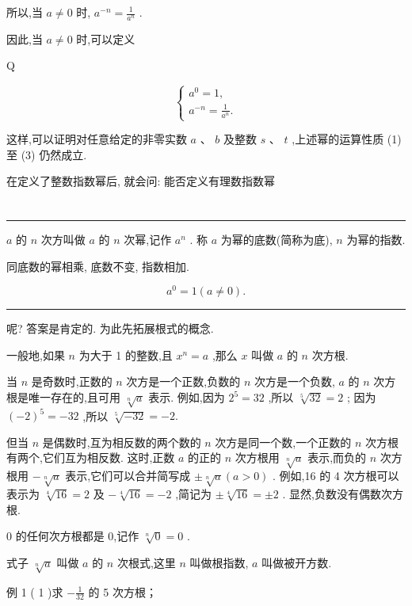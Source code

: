 \documentclass[10pt]{article}
\newcommand{\HRule}{\begin{center}\rule{0.9\linewidth}{0.2mm}\end{center}}
\begin{document}
所以,当 \(a \neq  0\) 时, \({a}^{-n} = \frac{1}{{a}^{n}}\) .

因此,当 \(a \neq  0\) 时,可以定义

Q

\[
\left\{  \begin{array}{l} {a}^{0} = 1, \\  {a}^{-n} = \frac{1}{{a}^{n}}. \end{array}\right.
\]

这样,可以证明对任意给定的非零实数 \(a\text{ 、 }b\) 及整数 \(s\text{ 、 }t\) ,上述幂的运算性质 (1) 至 (3) 仍然成立.

在定义了整数指数幂后, 就会问: 能否定义有理数指数幂

\section*{}

\HRule

\(a\) 的 \(n\) 次方叫做 \(a\) 的 \(n\) 次幂,记作 \({a}^{n}\) . 称 \(a\) 为幂的底数(简称为底), \(n\) 为幂的指数.

同底数的幂相乘, 底数不变, 指数相加.

\[
{a}^{0} = 1\left( {a \neq  0}\right) .
\]

\HRule

呢? 答案是肯定的. 为此先拓展根式的概念.

一般地,如果 \(n\) 为大于 1 的整数,且 \({x}^{n} = a\) ,那么 \(x\) 叫做 \(a\) 的 \(n\) 次方根.

当 \(n\) 是奇数时,正数的 \(n\) 次方是一个正数,负数的 \(n\) 次方是一个负数, \(a\) 的 \(n\) 次方根是唯一存在的,且可用 \(\sqrt[n]{a}\) 表示. 例如,因为 \({2}^{5} = {32}\) ,所以 \(\sqrt[5]{32} = 2\) ; 因为 \({\left( -2\right) }^{5} =  - {32}\) ,所以 \(\sqrt[5]{-{32}} =  - 2.\)

但当 \(n\) 是偶数时,互为相反数的两个数的 \(n\) 次方是同一个数,一个正数的 \(n\) 次方根有两个,它们互为相反数. 这时,正数 \(a\) 的正的 \(n\) 次方根用 \(\sqrt[n]{a}\) 表示,而负的 \(n\) 次方根用 \(- \sqrt[n]{a}\) 表示,它们可以合并简写成 \(\pm  \sqrt[n]{a}\left( {a > 0}\right)\) . 例如,16 的 4 次方根可以表示为 \(\sqrt[4]{16} = 2\) 及 \(- \sqrt[4]{16} =  - 2\) ,简记为 \(\pm  \sqrt[4]{16} =  \pm  2\) . 显然,负数没有偶数次方根.

0 的任何次方根都是 0,记作 \(\sqrt[n]{0} = 0\) .

式子 \(\sqrt[n]{a}\) 叫做 \(a\) 的 \(n\) 次根式,这里 \(n\) 叫做根指数, \(a\) 叫做被开方数.

例 1 ( 1 )求 \(- \frac{1}{32}\) 的 5 次方根；
\end{document}
